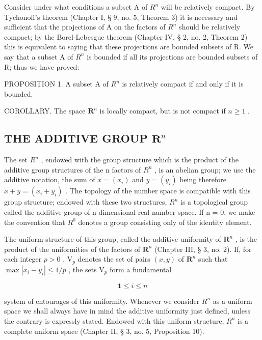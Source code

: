 Consider under what conditions a subset A of \(R^{n}\) will be relatively compact. By Tychonoff's theorem (Chapter I, § 9, no. 5, Theorem 3) it is necessary and sufficient that the projections of A on the factors of \(R^{n}\) should be relatively compact; by the Borel-Lebesgue theorem (Chapter IV, § 2, no. 2, Theorem 2) this is equivalent to saying that these projections are bounded subsets of R. We say that a subset A of \(R^{n}\) is bounded if all its projections are bounded subsets of R; thus we have proved:

PROPOSITION 1. A subset A of \(R^{n}\) is relatively compact if and only if it is bounded.

COROLLARY. The space \(\mathbf{R}^n\) is locally compact, but is not compact if \(n \geqslant 1\) .

\subsection{\texorpdfstring{THE ADDITIVE GROUP \(\mathbf{R}^n\)}{THE ADDITIVE GROUP R TO THE N}}

The set \(R^{n}\) , endowed with the group structure which is the product of the additive group structures of the n factors of \(R^{n}\) , is an abelian group; we use the additive notation, the sum of \(x = (x_{i})\) and \(y = (y_{i})\) being therefore \(x + y = (x_{i} + y_{i})\) . The topology of the number space is compatible with this group structure; endowed with these two structures, \(R^{n}\) is a topological group called the additive group of n-dimensional real number space. If n = 0, we make the convention that \(R^{0}\) denotes a group consisting only of the identity element.

The uniform structure of this group, called the additive uniformity of \(\mathbf{R}^n\) , is the product of the uniformities of the factors of \(\mathbf{R}^n\) (Chapter III, § 3, no. 2). If, for each integer \(p > 0\) , \(\mathrm{V}_p\) denotes the set of pairs \((x, y)\) of \(\mathbf{R}^n\) such that \(\max |x_i - y_i| \leqslant 1/p\) , the sets \(\mathrm{V}_p\) form a fundamental

\[
\mathbf {1} \leqslant i \leqslant n
\]

system of entourages of this uniformity. Whenever we consider \(R^{n}\) as a uniform space we shall always have in mind the additive uniformity just defined, unless the contrary is expressly stated. Endowed with this uniform structure, \(R^{n}\) is a complete uniform space (Chapter II, § 3, no. 5, Proposition 10).

